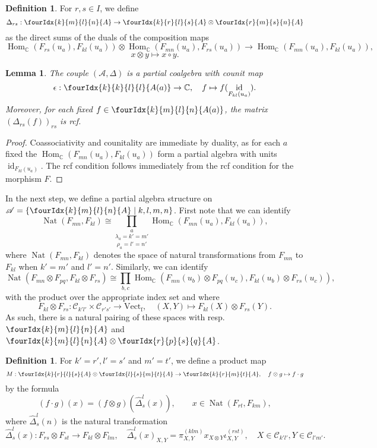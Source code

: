 \documentclass[11pt]{article}
\DeclareMathOperator{\fin}{\mathrm{f}}
\DeclareMathOperator{\id}{id}
\DeclareMathOperator{\Hom}{Hom}
\DeclareMathOperator{\Nat}{\mathrm{Nat}}
\newcommand{\C}{\mathbb{C}}
\newcommand{\CatC}{\mathcal{C}}
\newcommand{\Vect}{\mathrm{Vect}}
\newcommand{\Gr}[5]{\fourIdx{#2}{#4}{#3}{#5}{#1}}%
\newtheorem{Lem}[Theorem]{Lemma}
\theoremstyle{definition}
\newtheorem{Def}[Theorem]{Definition}
\numberwithin{equation}{section}
\begin{document}
\begin{Def} For $r,s\in I$, we define \[\Delta_{rs}: \Gr{A}{k}{l}{m}{n}\rightarrow \Gr{A}{k}{l}{r}{s}\otimes \Gr{A}{r}{s}{m}{n}\] as the direct sums of the duals of the composition maps \[\Hom_{\C}(F_{rs}(u_a),F_{kl}(u_a)) \otimes \Hom_{\C}(F_{mn}(u_a),F_{rs}(u_a))\rightarrow \Hom_{\C}(F_{mn}(u_a),F_{kl}(u_a)),\]\[x\otimes y \mapsto x\circ y.\]
\end{Def} 

\begin{Lem} The couple $(\mathscr{A},\Delta)$ is a partial coalgebra with counit map \[\epsilon:\Gr{A(a)}{k}{l}{k}{l}\rightarrow \C,\quad f\mapsto f(\id_{F_{kl}(u_a)}).\] Moreover, for each fixed $f\in \Gr{A(a)}{k}{l}{m}{n}$, the matrix $\left(\Delta_{rs}(f)\right)_{rs}$ is rcf.
\end{Lem} 
\begin{proof} Coassociativity and counitality are immediate by duality, as for each $a$ fixed the $\Hom_{\C}(F_{mn}(u_a),F_{kl}(u_a))$ form a partial algebra with units $\id_{F_{kl}(u_a)}$. The rcf condition follows immediately from the rcf condition for the morphism $F$.
\end{proof}

In the next step, we define a partial algebra structure on $\mathscr{A} = \{\Gr{A}{k}{l}{m}{n}\mid k,l,m,n\}$. First note that we can identify \[\Nat(F_{mn},F_{kl}) \cong \underset{\rho_a=l'=n'}{\underset{\lambda_a=k'=m'}{\prod_a}} \Hom_{\C}(F_{mn}(u_a),F_{kl}(u_a)),\] where $\Nat(F_{mn},F_{kl})$ denotes the space of natural transformations from $F_{mn}$ to $F_{kl}$ when $k'=m'$ and $l'=n'$. Similarly, we can identify \[\Nat(F_{mn}\otimes F_{pq},F_{kl}\otimes F_{rs}) \cong  \prod_{b,c} \Hom_{\C}(F_{mn}(u_b)\otimes F_{pq}(u_c) ,F_{kl}(u_b)\otimes F_{rs}(u_c)),\] with the product over the appropriate index set and where \[F_{kl}\otimes F_{rs}:\CatC_{k'l'}\times \CatC_{r's'}\rightarrow \Vect_{\fin},\quad (X,Y) \mapsto F_{kl}(X)\otimes F_{rs}(Y).\] As such, there is a natural pairing of these spaces with resp.~ $\Gr{A}{k}{l}{m}{n}$ and $\Gr{A}{k}{l}{m}{n}\otimes \Gr{A}{r}{s}{p}{q}$. 

\begin{Def} For $k'=r', l'=s'$ and $m'=t'$, we define a product map \[M:\Gr{A}{k}{l}{r}{s} \otimes \Gr{A}{l}{m}{s}{t}\rightarrow  \Gr{A}{k}{m}{r}{t},\quad f\otimes g \mapsto f\cdot g\] by the formula \[(f\cdot g)(x) = (f\otimes g)( \hat{\Delta}^{l}_{s}(x)), \qquad  x \in \Nat(F_{rt},F_{km}),\] where $\hat{\Delta}^l_s(n)$ is the natural transformation\[\hat{\Delta}^l_s(x):  F_{rs}\otimes F_{st}\rightarrow F_{kl}\otimes F_{lm},\quad \hat{\Delta}^l_s(x)_{X,Y} = \pi^{(klm)}_{X,Y}x_{X\otimes Y} \iota^{(rst)}_{X,Y},\quad X\in \CatC_{k'l'},Y\in \CatC_{l'm'}.\]
\end{Def}
\end{document}

